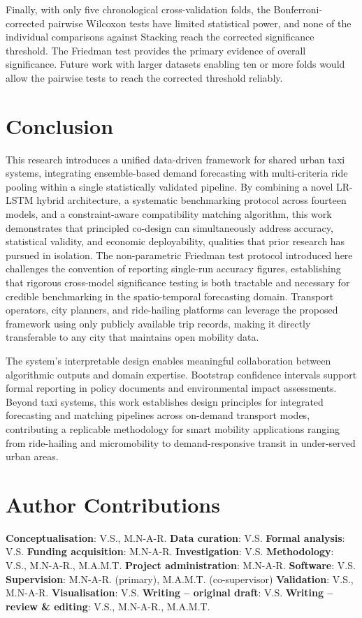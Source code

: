 \documentclass[a4paper,fleqn]{cas-dc}
\begin{document}
Finally, with only five chronological cross-validation folds, the Bonferroni-corrected pairwise Wilcoxon tests have limited statistical power, and none of the individual comparisons against Stacking reach the corrected significance threshold.  The Friedman test provides the primary evidence of overall significance.  Future work with larger datasets enabling ten or more folds would allow the pairwise tests to reach the corrected threshold reliably.

\FloatBarrier
\section{Conclusion}
\label{sec:conclusion}

This research introduces a unified data-driven framework for shared urban taxi systems, integrating ensemble-based demand forecasting with multi-criteria ride pooling within a single statistically validated pipeline.  By combining a novel LR-LSTM hybrid architecture, a systematic benchmarking protocol across fourteen models, and a constraint-aware compatibility matching algorithm, this work demonstrates that principled co-design can simultaneously address accuracy, statistical validity, and economic deployability, qualities that prior research has pursued in isolation.  The non-parametric Friedman test protocol introduced here challenges the convention of reporting single-run accuracy figures, establishing that rigorous cross-model significance testing is both tractable and necessary for credible benchmarking in the spatio-temporal forecasting domain.  Transport operators, city planners, and ride-hailing platforms can leverage the proposed framework using only publicly available trip records, making it directly transferable to any city that maintains open mobility data.

The system's interpretable design enables meaningful collaboration between algorithmic outputs and domain expertise.  Bootstrap confidence intervals support formal reporting in policy documents and environmental impact assessments.  Beyond taxi systems, this work establishes design principles for integrated forecasting and matching pipelines across on-demand transport modes, contributing a replicable methodology for smart mobility applications ranging from ride-hailing and micromobility to demand-responsive transit in under-served urban areas.

\section*{Author Contributions}
\textbf{Conceptualisation}: V.S., M.N-A-R.
\textbf{Data curation}: V.S.
\textbf{Formal analysis}: V.S.
\textbf{Funding acquisition}: M.N-A-R.
\textbf{Investigation}: V.S.
\textbf{Methodology}: V.S., M.N-A-R., M.A.M.T.
\textbf{Project administration}: M.N-A-R.
\textbf{Software}: V.S.
\textbf{Supervision}: M.N-A-R. (primary), M.A.M.T. (co-supervisor)
\textbf{Validation}: V.S., M.N-A-R.
\textbf{Visualisation}: V.S.
\textbf{Writing -- original draft}: V.S.
\textbf{Writing -- review \& editing}: V.S., M.N-A-R., M.A.M.T.
\end{document}
